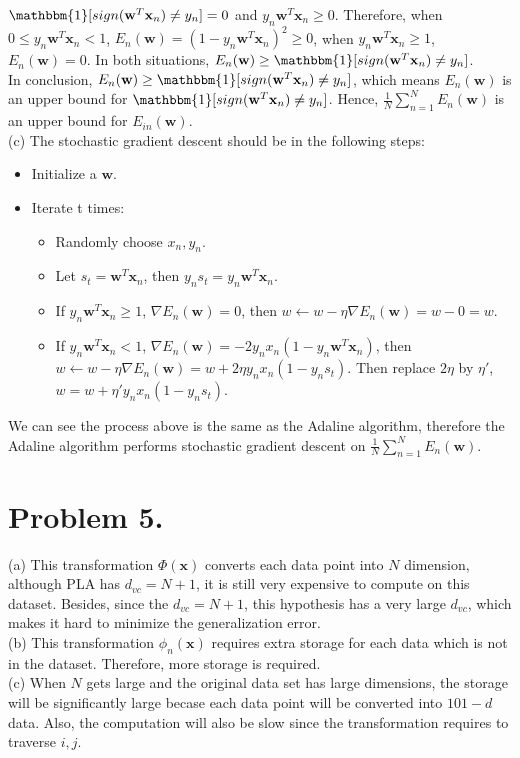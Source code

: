 \documentclass{article}
\begin{document}
    $\mathbbm{1}[sign(\mathbf{w}^T\mathbf{x}_n) \neq y_n] = 0$ and $y_n\mathbf{w}^T\mathbf{x}_n \geq 0$. Therefore, 
    when $0 \leq y_n\mathbf{w}^T\mathbf{x}_n < 1$, $E_n(\mathbf{w}) = (1 - y_n\mathbf{w}^T\mathbf{x}_n)^2 \geq 0$, 
    when $y_n\mathbf{w}^T\mathbf{x}_n \geq 1$, $E_n(\mathbf{w}) = 0$. In both situations, $E_n(\mathbf{w}) \geq 
    \mathbbm{1}[sign(\mathbf{w}^T\mathbf{x}_n) \neq y_n]$.\\
    In conclusion, $E_n(\mathbf{w}) \geq \mathbbm{1}[sign(\mathbf{w}^T\mathbf{x}_n) \neq y_n]$, which means 
    $E_n(\mathbf{w})$ is an upper bound for $\mathbbm{1}[sign(\mathbf{w}^T\mathbf{x}_n) \neq y_n]$. Hence, 
    $\frac{1}{N}\sum_{n=1}^{N}E_n(\mathbf{w})$ is an upper bound for $E_{in}(\mathbf{w})$.\\
    (c) The stochastic gradient descent should be in the following steps:
    \begin{itemize}
        \item Initialize a $\mathbf{w}$. 
        \item Iterate t times:
        \begin{itemize}
            \item Randomly choose $x_n, y_n$.
            \item Let $s_t = \mathbf{w}^T\mathbf{x}_n$, then $y_ns_t = y_n\mathbf{w}^T\mathbf{x}_n$.
            \item If $y_n\mathbf{w}^T\mathbf{x}_n \geq 1$, $\nabla E_n(\mathbf{w}) = 0$, then 
            $w \gets w - \eta\nabla E_n(\mathbf{w}) = w - 0 = w$.
            \item If $y_n\mathbf{w}^T\mathbf{x}_n < 1$, $\nabla E_n(\mathbf{w}) = 
            -2y_nx_n(1 - y_n\mathbf{w}^T\mathbf{x}_n)$, then $w \gets w - \eta\nabla E_n(\mathbf{w}) = 
            w + 2\eta y_nx_n(1 - y_ns_t)$. Then replace $2\eta$ by $\eta'$, $w = w + \eta' y_nx_n(1 - y_ns_t)$.
        \end{itemize}
    \end{itemize}
    We can see the process above is the same as the Adaline algorithm, therefore the Adaline algorithm performs
    stochastic gradient descent on $\frac{1}{N}\sum_{n=1}^{N}E_n(\mathbf{w})$.

    \section*{Problem 5.}
    (a) This transformation $\Phi(\mathbf{x})$ converts each data point into $N$ dimension, although PLA has
    $d_{vc} = N + 1$, it is still very expensive to compute on this dataset. Besides, since the $d_{vc} = N + 1$, 
    this hypothesis has a very large $d_{vc}$, which makes it hard to minimize the generalization error.\\
    (b) This transformation $\phi_n(\mathbf{x})$ requires extra storage for each data which is not in the dataset.
    Therefore, more storage is required.\\
    (c) When $N$ gets large and the original data set has large dimensions, the storage will be significantly large 
    becase each data point will be converted into $101-d$ data. Also, the computation will also be slow since the 
    transformation requires to traverse $i, j$.
\end{document}
